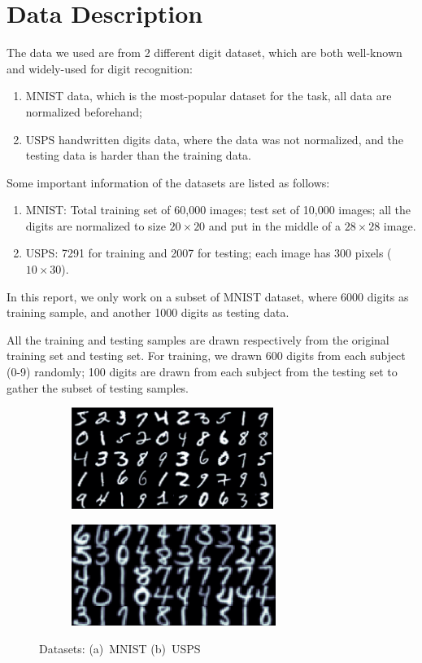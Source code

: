 \documentclass[12pt]{article}
\begin{document}
\section{Data Description}
\label{sec:data}
The data we used are from 2 different digit dataset, which are both well-known and widely-used for digit recognition:\begin{enumerate}
\item MNIST data\cite{lecun1998gradient}, which is the most-popular dataset for the task, all data are normalized beforehand;
\item USPS handwritten digits data\cite{hull1994database}, where the data was not normalized, and the testing data is harder than the training data.
\end{enumerate}

Some important information of the datasets are listed as follows:
\begin{enumerate}
\item MNIST: Total training set of 60,000 images; test set of 10,000 images; all the digits are normalized to size $20 \times 20$ and put in the middle of a $28 \times 28$ image.
\item USPS: 7291 for training and 2007 for testing; each image has 300 pixels ($10 \times 30$).
\end{enumerate}

In this report, we only work on a subset of MNIST dataset, where 6000 digits as training sample, and another 1000 digits as testing data.

All the training and testing samples are drawn respectively from the original training set and testing set. For training, we drawn 600 digits from each subject (0-9) randomly; 100 digits are drawn from each subject from the testing set to gather the subset of testing samples.

\begin{figure}[tbp]
	\centering
	\begin{subfigure}{.45\textwidth}
		\includegraphics[height = 1.3in]{MNIST}		
		\caption{ }
	\end{subfigure}
	\begin{subfigure}{.45\textwidth}
		\includegraphics[height = 1.3in]{USPS}		
		\caption{ }
	\end{subfigure}
	\caption{Datasets: (a)~MNIST (b)~USPS}
\end{figure}
\end{document}
